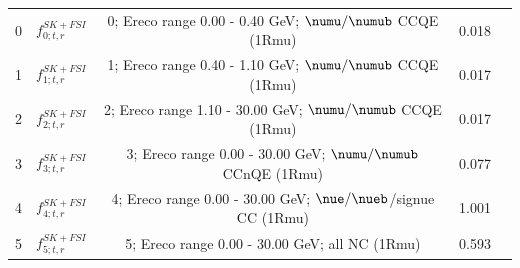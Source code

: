 {\begin{table}
\begin{tabular}{| c | c | c | c | c |}
\hline

0      &  $f_{0; t, r}^{SK+FSI}$                  &   0; Ereco range 0.00 - 0.40 GeV; \(\numu/\numub\) CCQE (1Rmu)              & 0.018      \\ 
1      &  $f_{1; t, r}^{SK+FSI}$                  &   1; Ereco range 0.40 - 1.10 GeV; \(\numu/\numub\) CCQE (1Rmu)              & 0.017      \\ 
2      &  $f_{2; t, r}^{SK+FSI}$                  &   2; Ereco range 1.10 - 30.00 GeV; \(\numu/\numub\) CCQE (1Rmu)             & 0.017      \\ 
3      &  $f_{3; t, r}^{SK+FSI}$                  &   3; Ereco range 0.00 - 30.00 GeV; \(\numu/\numub\) CCnQE (1Rmu)            & 0.077      \\ 
4      &  $f_{4; t, r}^{SK+FSI}$                  &   4; Ereco range 0.00 - 30.00 GeV; \(\nue/\nueb\)/signue CC (1Rmu)          & 1.001      \\ 
5      &  $f_{5; t, r}^{SK+FSI}$                  &   5; Ereco range 0.00 - 30.00 GeV; all NC (1Rmu)                        & 0.593      \\ 


\end{tabular}
\end{table}}
